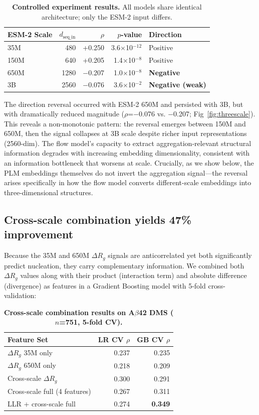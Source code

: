 \documentclass[10pt,letterpaper]{article}
\begin{document}
\begin{table}[h]
\centering
\caption{{\bf Controlled experiment results.} All models share identical architecture; only the ESM-2 input differs.}
\begin{tabular}{lrrrl}
\toprule
ESM-2 Scale & $d_{\text{seq\_in}}$ & $\rho$ & $p$-value & Direction \\
\midrule
35M & 480 & +0.250 & 3.6$\times$10$^{-12}$ & Positive \\
150M & 640 & +0.205 & 1.4$\times$10$^{-8}$ & Positive \\
650M & 1280 & $-$0.207 & 1.0$\times$10$^{-8}$ & \textbf{Negative} \\
3B & 2560 & $-$0.076 & 3.6$\times$10$^{-2}$ & \textbf{Negative (weak)} \\
\bottomrule
\end{tabular}
\label{tab:controlled}
\end{table}

The direction reversal occurred with ESM-2 650M and persisted with 3B, but with dramatically reduced magnitude ($\rho$=$-$0.076 vs. $-$0.207; Fig~\ref{fig:threescale}). This reveals a non-monotonic pattern: the reversal emerges between 150M and 650M, then the signal collapses at 3B scale despite richer input representations (2560-dim). The flow model's capacity to extract aggregation-relevant structural information degrades with increasing embedding dimensionality, consistent with an information bottleneck that worsens at scale. Crucially, as we show below, the PLM embeddings themselves do not invert the aggregation signal---the reversal arises specifically in how the flow model converts different-scale embeddings into three-dimensional structures.

\subsection*{Cross-scale combination yields 47\% improvement}

Because the 35M and 650M $\Delta R_g$ signals are anticorrelated yet both significantly predict nucleation, they carry complementary information. We combined both $\Delta R_g$ values along with their product (interaction term) and absolute difference (divergence) as features in a Gradient Boosting model with 5-fold cross-validation:

\begin{table}[h]
\centering
\caption{{\bf Cross-scale combination results on A$\beta$42 DMS ($n$=751, 5-fold CV).}}
\begin{tabular}{lrr}
\toprule
Feature Set & LR CV $\rho$ & GB CV $\rho$ \\
\midrule
$\Delta R_g$ 35M only & 0.237 & 0.235 \\
$\Delta R_g$ 650M only & 0.218 & 0.209 \\
Cross-scale $\Delta R_g$ & 0.300 & 0.291 \\
Cross-scale full (4 features) & 0.267 & 0.311 \\
LLR + cross-scale full & 0.274 & \textbf{0.349} \\
\bottomrule
\end{tabular}
\label{tab:crossscale}
\end{table}
\end{document}
